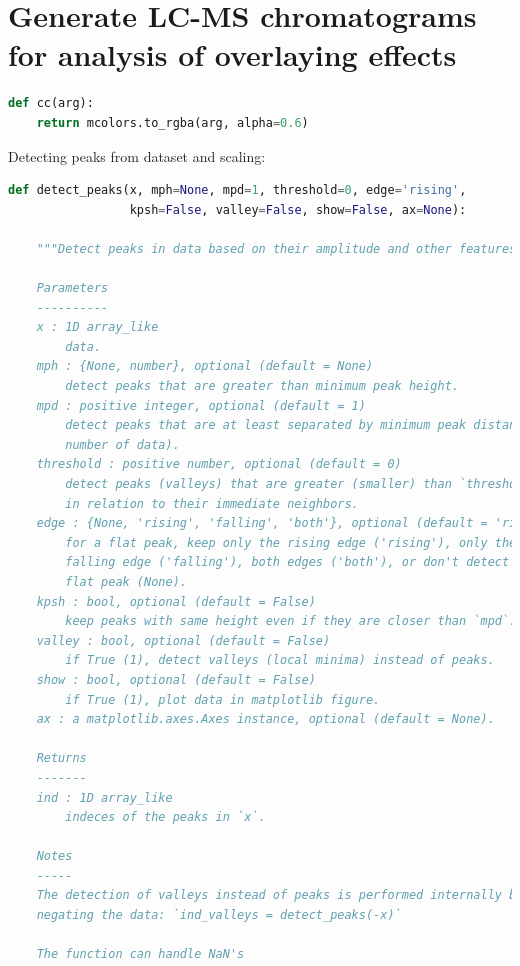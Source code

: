 \section{Generate LC-MS chromatograms for analysis of overlaying
effects}\label{generate-lc-ms-chromatograms-for-analysis-of-overlaying-effects}

\begin{lstlisting}[language=Python]
def cc(arg):
    return mcolors.to_rgba(arg, alpha=0.6)
\end{lstlisting}

Detecting peaks from dataset and scaling:

\begin{lstlisting}[language=Python]
def detect_peaks(x, mph=None, mpd=1, threshold=0, edge='rising',
                 kpsh=False, valley=False, show=False, ax=None):

    """Detect peaks in data based on their amplitude and other features.

    Parameters
    ----------
    x : 1D array_like
        data.
    mph : {None, number}, optional (default = None)
        detect peaks that are greater than minimum peak height.
    mpd : positive integer, optional (default = 1)
        detect peaks that are at least separated by minimum peak distance (in
        number of data).
    threshold : positive number, optional (default = 0)
        detect peaks (valleys) that are greater (smaller) than `threshold`
        in relation to their immediate neighbors.
    edge : {None, 'rising', 'falling', 'both'}, optional (default = 'rising')
        for a flat peak, keep only the rising edge ('rising'), only the
        falling edge ('falling'), both edges ('both'), or don't detect a
        flat peak (None).
    kpsh : bool, optional (default = False)
        keep peaks with same height even if they are closer than `mpd`.
    valley : bool, optional (default = False)
        if True (1), detect valleys (local minima) instead of peaks.
    show : bool, optional (default = False)
        if True (1), plot data in matplotlib figure.
    ax : a matplotlib.axes.Axes instance, optional (default = None).

    Returns
    -------
    ind : 1D array_like
        indeces of the peaks in `x`.

    Notes
    -----
    The detection of valleys instead of peaks is performed internally by simply
    negating the data: `ind_valleys = detect_peaks(-x)`
    
    The function can handle NaN's 


\end{lstlisting}
